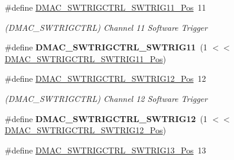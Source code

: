 \begin{DoxyCompactItemize}
\item 
\hypertarget{group___s_a_m_l21___d_m_a_c_gada09cd414a3038f1a8066b9f31145ed1}{}\#define \hyperlink{group___s_a_m_l21___d_m_a_c_gada09cd414a3038f1a8066b9f31145ed1}{D\+M\+A\+C\+\_\+\+S\+W\+T\+R\+I\+G\+C\+T\+R\+L\+\_\+\+S\+W\+T\+R\+I\+G11\+\_\+\+Pos}~11\label{group___s_a_m_l21___d_m_a_c_gada09cd414a3038f1a8066b9f31145ed1}

\begin{DoxyCompactList}\small\item\em (D\+M\+A\+C\+\_\+\+S\+W\+T\+R\+I\+G\+C\+T\+R\+L) Channel 11 Software Trigger \end{DoxyCompactList}\item 
\hypertarget{group___s_a_m_l21___d_m_a_c_ga94f459bfcef40f769ba47cbcdedc8da5}{}\#define {\bfseries D\+M\+A\+C\+\_\+\+S\+W\+T\+R\+I\+G\+C\+T\+R\+L\+\_\+\+S\+W\+T\+R\+I\+G11}~(1 $<$$<$ \hyperlink{group___s_a_m_l21___d_m_a_c_gada09cd414a3038f1a8066b9f31145ed1}{D\+M\+A\+C\+\_\+\+S\+W\+T\+R\+I\+G\+C\+T\+R\+L\+\_\+\+S\+W\+T\+R\+I\+G11\+\_\+\+Pos})\label{group___s_a_m_l21___d_m_a_c_ga94f459bfcef40f769ba47cbcdedc8da5}

\item 
\hypertarget{group___s_a_m_l21___d_m_a_c_ga8d1c33c366fa760fcb72bad9721365c9}{}\#define \hyperlink{group___s_a_m_l21___d_m_a_c_ga8d1c33c366fa760fcb72bad9721365c9}{D\+M\+A\+C\+\_\+\+S\+W\+T\+R\+I\+G\+C\+T\+R\+L\+\_\+\+S\+W\+T\+R\+I\+G12\+\_\+\+Pos}~12\label{group___s_a_m_l21___d_m_a_c_ga8d1c33c366fa760fcb72bad9721365c9}

\begin{DoxyCompactList}\small\item\em (D\+M\+A\+C\+\_\+\+S\+W\+T\+R\+I\+G\+C\+T\+R\+L) Channel 12 Software Trigger \end{DoxyCompactList}\item 
\hypertarget{group___s_a_m_l21___d_m_a_c_gad95397c3fceb925fc21ecc43f70d516f}{}\#define {\bfseries D\+M\+A\+C\+\_\+\+S\+W\+T\+R\+I\+G\+C\+T\+R\+L\+\_\+\+S\+W\+T\+R\+I\+G12}~(1 $<$$<$ \hyperlink{group___s_a_m_l21___d_m_a_c_ga8d1c33c366fa760fcb72bad9721365c9}{D\+M\+A\+C\+\_\+\+S\+W\+T\+R\+I\+G\+C\+T\+R\+L\+\_\+\+S\+W\+T\+R\+I\+G12\+\_\+\+Pos})\label{group___s_a_m_l21___d_m_a_c_gad95397c3fceb925fc21ecc43f70d516f}

\item 
\hypertarget{group___s_a_m_l21___d_m_a_c_ga4c1e5438c576a7e565eb87993d0d19a6}{}\#define \hyperlink{group___s_a_m_l21___d_m_a_c_ga4c1e5438c576a7e565eb87993d0d19a6}{D\+M\+A\+C\+\_\+\+S\+W\+T\+R\+I\+G\+C\+T\+R\+L\+\_\+\+S\+W\+T\+R\+I\+G13\+\_\+\+Pos}~13\label{group___s_a_m_l21___d_m_a_c_ga4c1e5438c576a7e565eb87993d0d19a6}


\end{DoxyCompactItemize}
